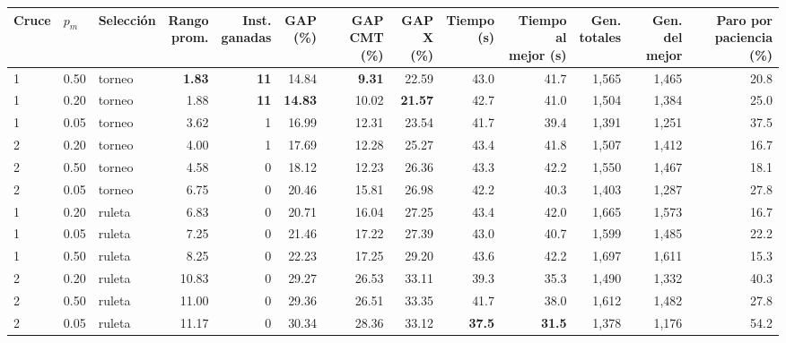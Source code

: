 \begin{tabular}{lllrrrrrrrrrr}
\toprule
Cruce & $p_m$ & Selección & \makecell{Rango\\prom.} & \makecell{Inst.\\ganadas} & \makecell{GAP\\(\%)} & \makecell{GAP\\CMT (\%)} & \makecell{GAP\\X (\%)} & \makecell{Tiempo\\(s)} & \makecell{Tiempo al\\mejor (s)} & \makecell{Gen.\\totales} & \makecell{Gen. del\\mejor} & \makecell{Paro por\\paciencia (\%)} \\
\midrule
1 & 0.50 & torneo & \textbf{1.83} & \textbf{11} & 14.84 & \textbf{9.31} & 22.59 & 43.0 & 41.7 & 1,565 & 1,465 & 20.8 \\
1 & 0.20 & torneo & 1.88 & \textbf{11} & \textbf{14.83} & 10.02 & \textbf{21.57} & 42.7 & 41.0 & 1,504 & 1,384 & 25.0 \\
1 & 0.05 & torneo & 3.62 & 1 & 16.99 & 12.31 & 23.54 & 41.7 & 39.4 & 1,391 & 1,251 & 37.5 \\
2 & 0.20 & torneo & 4.00 & 1 & 17.69 & 12.28 & 25.27 & 43.4 & 41.8 & 1,507 & 1,412 & 16.7 \\
2 & 0.50 & torneo & 4.58 & 0 & 18.12 & 12.23 & 26.36 & 43.3 & 42.2 & 1,550 & 1,467 & 18.1 \\
2 & 0.05 & torneo & 6.75 & 0 & 20.46 & 15.81 & 26.98 & 42.2 & 40.3 & 1,403 & 1,287 & 27.8 \\
1 & 0.20 & ruleta & 6.83 & 0 & 20.71 & 16.04 & 27.25 & 43.4 & 42.0 & 1,665 & 1,573 & 16.7 \\
1 & 0.05 & ruleta & 7.25 & 0 & 21.46 & 17.22 & 27.39 & 43.0 & 40.7 & 1,599 & 1,485 & 22.2 \\
1 & 0.50 & ruleta & 8.25 & 0 & 22.23 & 17.25 & 29.20 & 43.6 & 42.2 & 1,697 & 1,611 & 15.3 \\
2 & 0.20 & ruleta & 10.83 & 0 & 29.27 & 26.53 & 33.11 & 39.3 & 35.3 & 1,490 & 1,332 & 40.3 \\
2 & 0.50 & ruleta & 11.00 & 0 & 29.36 & 26.51 & 33.35 & 41.7 & 38.0 & 1,612 & 1,482 & 27.8 \\
2 & 0.05 & ruleta & 11.17 & 0 & 30.34 & 28.36 & 33.12 & \textbf{37.5} & \textbf{31.5} & 1,378 & 1,176 & 54.2 \\
\bottomrule
\end{tabular}
